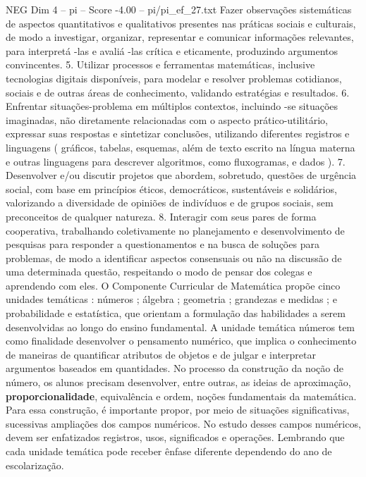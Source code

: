 \begin{textsample}{NEG Dim 4 – pi – Score -4.00 – pi/pi\_ef\_27.txt}
Fazer observações sistemáticas de aspectos quantitativos e qualitativos presentes nas práticas sociais e culturais, de modo a investigar, organizar, representar e comunicar informações relevantes, para interpretá -las e avaliá -las crítica e eticamente, produzindo argumentos convincentes. 5.
Utilizar processos e ferramentas matemáticas, inclusive tecnologias digitais disponíveis, para modelar e resolver problemas cotidianos, sociais e de outras áreas de conhecimento, validando estratégias e resultados. 6.
Enfrentar situações-problema em múltiplos contextos, incluindo -se situações imaginadas, não diretamente relacionadas com o aspecto prático-utilitário, expressar suas respostas e sintetizar conclusões, utilizando diferentes registros e linguagens ( gráficos, tabelas, esquemas, além de texto escrito na língua materna e outras linguagens para descrever algoritmos, como fluxogramas, e dados ). 7.
Desenvolver e/ou discutir projetos que abordem, sobretudo, questões de urgência social, com base em princípios éticos, democráticos, sustentáveis e solidários, valorizando a diversidade de opiniões de indivíduos e de grupos sociais, sem preconceitos de qualquer natureza. 8.
Interagir com seus pares de forma cooperativa, trabalhando coletivamente no planejamento e desenvolvimento de pesquisas para responder a questionamentos e na busca de soluções para problemas, de modo a identificar aspectos consensuais ou não na discussão de uma determinada questão, respeitando o modo de pensar dos colegas e aprendendo com eles.
O Componente Curricular de Matemática propõe cinco unidades temáticas : números ; álgebra ; geometria ; grandezas e medidas ; e probabilidade e estatística, que orientam a formulação das habilidades a serem desenvolvidas ao longo do ensino fundamental.
A unidade temática números tem como finalidade desenvolver o pensamento numérico, que implica o conhecimento de maneiras de quantificar atributos de objetos e de julgar e interpretar argumentos baseados em quantidades.
No processo da construção da noção de número, os alunos precisam desenvolver, entre outras, as ideias de aproximação, \textbf{proporcionalidade}, equivalência e ordem, noções fundamentais da matemática.
Para essa construção, é importante propor, por meio de situações significativas, sucessivas ampliações dos campos numéricos.
No estudo desses campos numéricos, devem ser enfatizados registros, usos, significados e operações.
Lembrando que cada unidade temática pode receber ênfase diferente dependendo do ano de escolarização.

\end{textsample}
